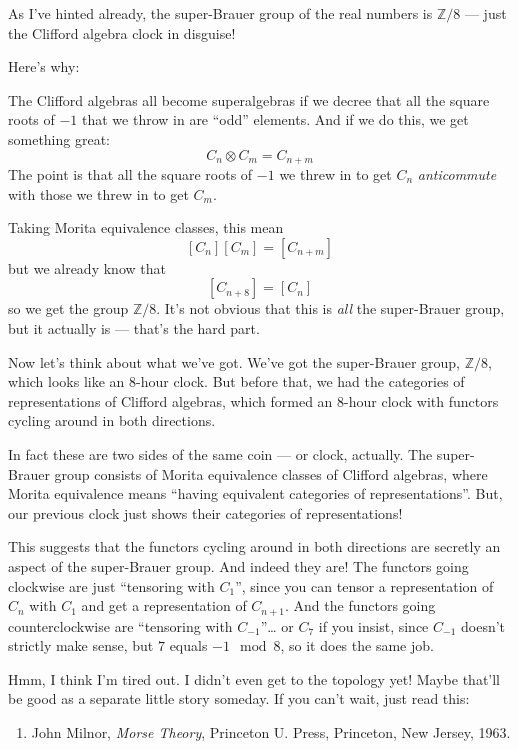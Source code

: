 \documentclass{article}
\def\tightlist{}
\begin{document}
As I've hinted already, the super-Brauer group of the real numbers is
\(\mathbb{Z}/8\) --- just the Clifford algebra clock in disguise!

Here's why:

The Clifford algebras all become superalgebras if we decree that all the
square roots of \(-1\) that we throw in are ``odd'' elements. And if we
do this, we get something great: \[C_n \otimes C_m = C_{n+m}\] The point
is that all the square roots of \(-1\) we threw in to get \(C_n\)
\emph{anticommute} with those we threw in to get \(C_m\).

Taking Morita equivalence classes, this mean \[[C_n] [C_m] = [C_{n+m}]\]
but we already know that \[[C_{n+8}] = [C_n]\] so we get the group
\(\mathbb{Z}/8\). It's not obvious that this is \emph{all} the
super-Brauer group, but it actually is --- that's the hard part.

Now let's think about what we've got. We've got the super-Brauer group,
\(\mathbb{Z}/8\), which looks like an 8-hour clock. But before that, we
had the categories of representations of Clifford algebras, which formed
an 8-hour clock with functors cycling around in both directions.

In fact these are two sides of the same coin --- or clock, actually. The
super-Brauer group consists of Morita equivalence classes of Clifford
algebras, where Morita equivalence means ``having equivalent categories
of representations''. But, our previous clock just shows their
categories of representations!

This suggests that the functors cycling around in both directions are
secretly an aspect of the super-Brauer group. And indeed they are! The
functors going clockwise are just ``tensoring with \(C_1\)'', since you
can tensor a representation of \(C_n\) with \(C_1\) and get a
representation of \(C_{n+1}\). And the functors going counterclockwise
are ``tensoring with \(C_{-1}\)''\ldots{} or \(C_7\) if you insist,
since \(C_{-1}\) doesn't strictly make sense, but \(7\) equals
\(-1 \mod 8\), so it does the same job.

Hmm, I think I'm tired out. I didn't even get to the topology yet! Maybe
that'll be good as a separate little story someday. If you can't wait,
just read this:

\begin{enumerate}
\def\labelenumi{\arabic{enumi})}
\setcounter{enumi}{3}
\tightlist
\item
  John Milnor, \emph{Morse Theory}, Princeton U. Press, Princeton, New
  Jersey, 1963.
\end{enumerate}
\end{document}
